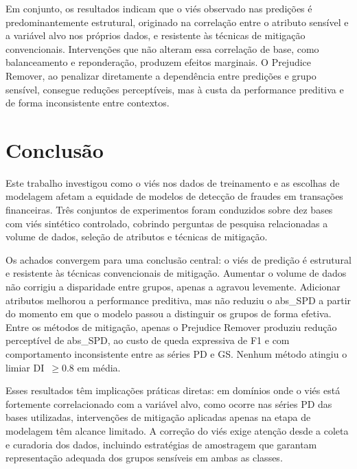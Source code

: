 Em conjunto, os resultados indicam que o viés observado nas predições é predominantemente estrutural, originado na correlação entre o atributo sensível e a variável alvo nos próprios dados, e resistente às técnicas de mitigação convencionais. Intervenções que não alteram essa correlação de base, como balanceamento e reponderação, produzem efeitos marginais. O Prejudice Remover, ao penalizar diretamente a dependência entre predições e grupo sensível, consegue reduções perceptíveis, mas à custa da performance preditiva e de forma inconsistente entre contextos.

\section{Conclusão}
\label{sec:conclusao}

Este trabalho investigou como o viés nos dados de treinamento e as escolhas de modelagem afetam a equidade de modelos de detecção de fraudes em transações financeiras. Três conjuntos de experimentos foram conduzidos sobre dez bases com viés sintético controlado, cobrindo perguntas de pesquisa relacionadas a volume de dados, seleção de atributos e técnicas de mitigação.

Os achados convergem para uma conclusão central: o viés de predição é estrutural e resistente às técnicas convencionais de mitigação. Aumentar o volume de dados não corrigiu a disparidade entre grupos, apenas a agravou levemente. Adicionar atributos melhorou a performance preditiva, mas não reduziu o abs\_SPD a partir do momento em que o modelo passou a distinguir os grupos de forma efetiva. Entre os métodos de mitigação, apenas o Prejudice Remover produziu redução perceptível de abs\_SPD, ao custo de queda expressiva de F1 e com comportamento inconsistente entre as séries PD e GS. Nenhum método atingiu o limiar DI~$\geq 0.8$ em média.

Esses resultados têm implicações práticas diretas: em domínios onde o viés está fortemente correlacionado com a variável alvo, como ocorre nas séries PD das bases utilizadas, intervenções de mitigação aplicadas apenas na etapa de modelagem têm alcance limitado. A correção do viés exige atenção desde a coleta e curadoria dos dados, incluindo estratégias de amostragem que garantam representação adequada dos grupos sensíveis em ambas as classes.